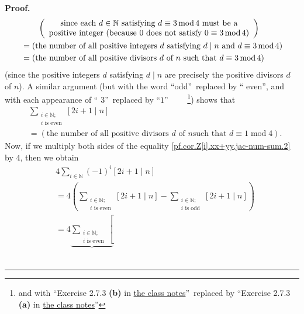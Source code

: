 \documentclass[paper=a4, fontsize=12pt]{scrartcl}%
\let\sumnonlimits\sum
\renewcommand{\sum}{\sumnonlimits\limits}
\theoremstyle{plainsl}
\theoremstyle{definition}
\theoremstyle{remark}
\newenvironment{proof}[1][Proof]{\noindent\textbf{#1.} }{\ \rule{0.5em}{0.5em}}
\begin{document}
\begin{proof}
\begin{align}
&  \qquad\left(
\begin{array}
[c]{c}%
\text{since each }d\in\mathbb{N}\text{ satisfying }d\equiv3\operatorname{mod}%
4\text{ must be a}\\
\text{positive integer (because }0\text{ does not satisfy }0\equiv
3\operatorname{mod}4\text{)}%
\end{array}
\right) \nonumber\\
&  =\left(  \text{the number of all positive integers }d\text{ satisfying
}d\mid n\text{ and }d\equiv3\operatorname{mod}4\right) \nonumber\\
&  =\left(  \text{the number of all positive divisors }d\text{ of }n\text{
such that }d\equiv3\operatorname{mod}4\right)
\label{pf.cor.Z[i].xx+yy.jac-num-sum.4o}%
\end{align}
(since the positive integers $d$ satisfying $d\mid n$ are precisely the
positive divisors $d$ of $n$). A similar argument (but with the word
\textquotedblleft odd\textquotedblright\ replaced by \textquotedblleft
even\textquotedblright, and with each appearance of \textquotedblleft%
$3$\textquotedblright\ replaced by \textquotedblleft$1$\textquotedblright%
\ \ \ \ \footnote{and with \textquotedblleft Exercise 2.7.3 \textbf{(b)} in
\href{http://www.cip.ifi.lmu.de/~grinberg/t/19s/notes.pdf}{the class
notes}\textquotedblright\ replaced by \textquotedblleft Exercise 2.7.3
\textbf{(a)} in \href{http://www.cip.ifi.lmu.de/~grinberg/t/19s/notes.pdf}{the
class notes}\textquotedblright}) shows that%
\begin{align}
&  \sum_{\substack{i\in\mathbb{N};\\i\text{ is even}}}\left[  2i+1\mid
n\right] \nonumber\\
&  =\left(  \text{the number of all positive divisors }d\text{ of }n\text{
such that }d\equiv1\operatorname{mod}4\right)  .
\label{pf.cor.Z[i].xx+yy.jac-num-sum.4e}%
\end{align}
Now, if we multiply both sides of the equality
\eqref{pf.cor.Z[i].xx+yy.jac-num-sum.2} by $4$, then we obtain%
\begin{align*}
&  4\sum_{i\in\mathbb{N}}\left(  -1\right)  ^{i}\left[  2i+1\mid n\right] \\
&  =4\left(  \sum_{\substack{i\in\mathbb{N};\\i\text{ is even}}}\left[
2i+1\mid n\right]  -\sum_{\substack{i\in\mathbb{N};\\i\text{ is odd}}}\left[
2i+1\mid n\right]  \right) \\
&  =4\underbrace{\sum_{\substack{i\in\mathbb{N};\\i\text{ is even}}}\left[
}
\end{align*}
\end{proof}
\end{document}
